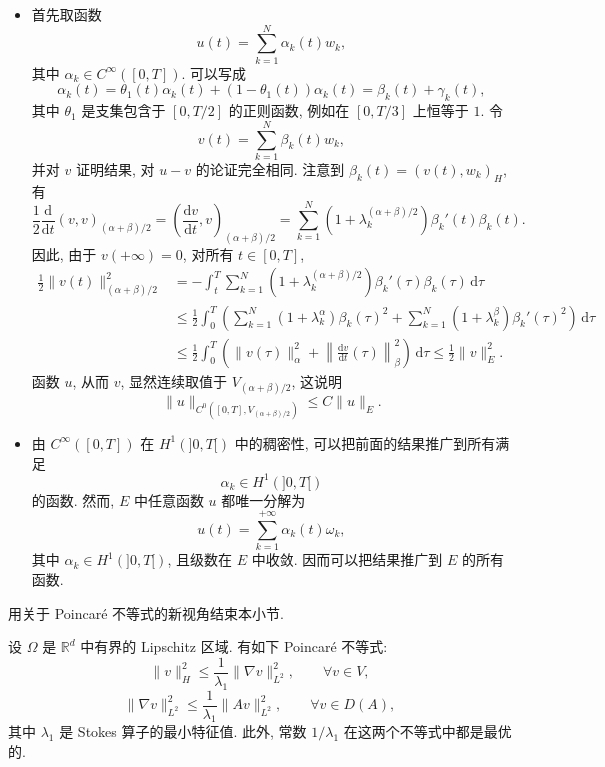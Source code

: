 \begin{Proof}
\begin{itemize}
 \item 首先取函数
 \[
  u(t)=\sum_{k=1}^N\alpha_k(t)w_k,
 \]
 其中 $\alpha_k\in C^\infty([0,T])$. 可以写成
 \[
  \alpha_k(t)=\theta_1(t)\alpha_k(t)+(1-\theta_1(t))\alpha_k(t)
  =\beta_k(t)+\gamma_k(t),
 \]
 其中 $\theta_1$ 是支集包含于 $[0,T/2]$ 的正则函数, 例如在 $[0,T/3]$ 上恒等于 $1$. 令
 \[
  v(t)=\sum_{k=1}^N\beta_k(t)w_k,
 \]
 并对 $v$ 证明结果, 对 $u-v$ 的论证完全相同. 注意到 $\beta_k(t)=(v(t),w_k)_H$, 有
 \[
  \frac12\frac{\mathrm d}{\mathrm dt}(v,v)_{(\alpha+\beta)/2}
  =\left(\frac{\mathrm dv}{\mathrm dt},v\right)_{(\alpha+\beta)/2}
  =\sum_{k=1}^N\left(1+\lambda_k^{(\alpha+\beta)/2}\right)\beta_k'(t)\beta_k(t).
 \]
 因此, 由于 $v(+\infty)=0$, 对所有 $t\in[0,T]$,
 \[
  \begin{aligned}
  \frac12\|v(t)\|_{(\alpha+\beta)/2}^2
  &=-\int_t^T\sum_{k=1}^N
  \left(1+\lambda_k^{(\alpha+\beta)/2}\right)\beta_k'(\tau)\beta_k(\tau)\,\mathrm d\tau\\
  &\leq\frac12\int_0^T\left(
  \sum_{k=1}^N(1+\lambda_k^\alpha)\beta_k(\tau)^2
  +\sum_{k=1}^N(1+\lambda_k^\beta)\beta_k'(\tau)^2\right)\,\mathrm d\tau\\
  &\leq\frac12\int_0^T\left(
  \|v(\tau)\|_\alpha^2
  +\left\|\frac{\mathrm dv}{\mathrm dt}(\tau)\right\|_\beta^2\right)\,\mathrm d\tau
  \leq\frac12\|v\|_E^2.
  \end{aligned}
 \]
 函数 $u$, 从而 $v$, 显然连续取值于 $V_{(\alpha+\beta)/2}$, 这说明
 \[
  \|u\|_{C^0([0,T],V_{(\alpha+\beta)/2})}\leq C\|u\|_E.
 \]

 \item 由 $C^\infty([0,T])$ 在 $H^1(]0,T[)$ 中的稠密性, 可以把前面的结果推广到所有满足
 \[
  \alpha_k\in H^1(]0,T[)
 \]
 的函数. 然而, $E$ 中任意函数 $u$ 都唯一分解为
 \[
  u(t)=\sum_{k=1}^{+\infty}\alpha_k(t)\omega_k,
 \]
 其中 $\alpha_k\in H^1(]0,T[)$, 且级数在 $E$ 中收敛. 因而可以把结果推广到 $E$ 的所有函数.
\end{itemize}
\end{Proof}

用关于 Poincaré 不等式的新视角结束本小节.

\begin{Proposition}
\label{prop:chap4-stokes-poincare-optimal}
设 $\Omega$ 是 $\mathbb R^d$ 中有界的 Lipschitz 区域. 有如下 Poincaré 不等式:
\begin{equation}
 \|v\|_H^2\leq\frac1{\lambda_1}\|\nabla v\|_{L^2}^2,
 \qquad\forall v\in V,
 \label{eq:chap4-stokes-poincare-v}
\end{equation}
\[
 \|\nabla v\|_{L^2}^2\leq\frac1{\lambda_1}\|Av\|_{L^2}^2,
 \qquad\forall v\in D(A),
\]
其中 $\lambda_1$ 是 Stokes 算子的最小特征值. 此外, 常数 $1/\lambda_1$ 在这两个不等式中都是最优的.
\end{Proposition}

